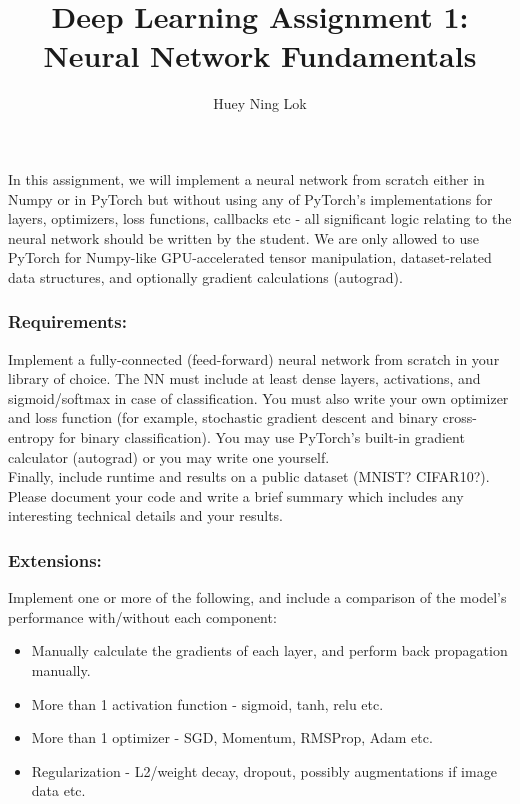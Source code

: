 \documentclass[11pt]{article}
\title{Deep Learning Assignment 1: Neural Network Fundamentals}
\author{Huey Ning Lok}
\providecommand{\tightlist}{%
      \setlength{\itemsep}{0pt}\setlength{\parskip}{0pt}}
\begin{document}
    
    
    \maketitle


    In this assignment, we will implement a neural network from scratch
either in Numpy or in PyTorch but without using any of PyTorch's
implementations for layers, optimizers, loss functions, callbacks etc -
all significant logic relating to the neural network should be written
by the student. We are only allowed to use PyTorch for Numpy-like
GPU-accelerated tensor manipulation, dataset-related data structures,
and optionally gradient calculations (autograd).

\subsubsection*{Requirements:}\label{requirements}

Implement a fully-connected (feed-forward) neural network from scratch
in your library of choice. The NN must include at least dense layers,
activations, and sigmoid/softmax in case of classification. You must
also write your own optimizer and loss function (for example, stochastic
gradient descent and binary cross-entropy for binary classification).
You may use PyTorch's built-in gradient calculator (autograd) or you may
write one yourself.\\

Finally, include runtime and results on a public dataset (MNIST?
CIFAR10?).\\

Please document your code and write a brief summary which includes any
interesting technical details and your results.

\subsubsection*{Extensions:}\label{extensions}

Implement one or more of the following, and include a comparison of the
model's performance with/without each component:

\begin{itemize}
\tightlist
\item
  Manually calculate the gradients of each layer, and perform back
  propagation manually.
\item
  More than 1 activation function - sigmoid, tanh, relu etc.
\item
  More than 1 optimizer - SGD, Momentum, RMSProp, Adam etc.
\item
  Regularization - L2/weight decay, dropout, possibly augmentations if
  image data etc.
\end{itemize}
\end{document}
